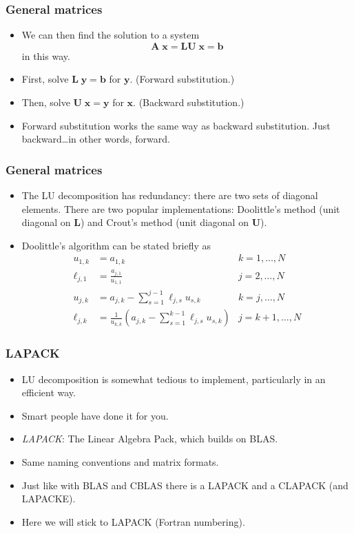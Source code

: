\begin{frame}[fragile]
  \frametitle{General matrices}
  \begin{itemize}
  \item We can then find the solution to a system
    \[ \bm A \;\bm x = \bm L \bm U \;\bm x = \bm b \]
    in this way.
  \item First, solve $\bm L\; \bm y = \bm b$ for $\bm y$. (Forward substitution.)
  \item Then, solve $\bm U\; \bm x = \bm y$ for $\bm x$. (Backward substitution.)
  \item Forward substitution works the same way as backward substitution. Just
    backward\ldots in other words, forward.
  \end{itemize}
\end{frame}

\begin{frame}
  \frametitle{General matrices}
  \begin{itemize}
  \item The LU decomposition has redundancy: there are two sets of diagonal
    elements. There are two popular implementations: Doolittle's method (unit
    diagonal on $\bm L$) and Crout's method (unit diagonal on $\bm U$).
  \item Doolittle's algorithm can be stated briefly as
    \begin{align*}
      u_{1,k} &= a_{1,k} & k = 1,\ldots,N \\
      \ell_{j,1} &= \frac{a_{j,1}}{u_{1,1}} & j = 2,\ldots,N \\
      u_{j,k} &= a_{j,k} - \sum_{s=1}^{j-1} \ell_{j,s} u_{s,k} & k = j,\ldots,N \\
      \ell_{j,k} &= \frac{1}{u_{k,k}}\left( a_{j,k} - \sum_{s=1}^{k-1} \ell_{j,s} u_{s,k} \right)
                         & j = k+1,\ldots,N
    \end{align*}
  \end{itemize}
\end{frame}

\begin{frame}
  \frametitle{LAPACK}
  \begin{itemize}
  \item LU decomposition is somewhat tedious to implement, particularly in an
    efficient way.
  \item Smart people have done it for you.
  \item \emph{LAPACK}: The Linear Algebra Pack, which builds on BLAS.
  \item Same naming conventions and matrix formats.
  \item Just like with BLAS and CBLAS there is a LAPACK and a CLAPACK (and
    LAPACKE).
  \item Here we will stick to LAPACK (Fortran numbering).
  \end{itemize}
\end{frame}

